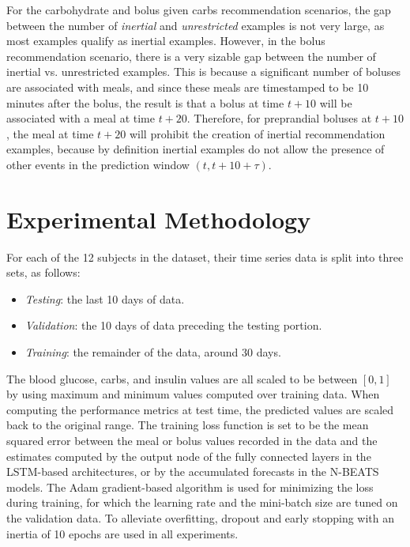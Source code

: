 \documentclass[journal,article,submit,moreauthors,pdftex]{Definitions/mdpi}
\begin{document}
For the carbohydrate and bolus given carbs recommendation scenarios, the gap between the number of {\it inertial} and {\it unrestricted} examples is not very large, as most examples qualify as inertial examples. However, in the bolus recommendation scenario, there is a very sizable gap between the number of inertial vs. unrestricted examples. This is because a significant number of boluses are associated with meals, and since these meals are timestamped to be 10 minutes after the bolus, the result is that a bolus at time $t + 10$ will be associated with a meal at time $t + 20$. Therefore, for preprandial boluses at $t + 10$, the meal at time $t + 20$ will prohibit the creation of inertial recommendation examples, because by definition inertial examples do not allow the presence of other events in the prediction window $(t, t + 10 + \tau)$.


\section{Experimental Methodology}
\label{sec:methodology}

For each of the 12 subjects in the dataset, their time series data is split into three sets, as follows:
\begin{itemize}
    \item {\it Testing}: the last 10 days of data.
    \item {\it Validation}: the 10 days of data preceding the testing portion.
    \item {\it Training}: the remainder of the data, around 30 days.
\end{itemize}
The blood glucose, carbs, and insulin values are all scaled to be between $[0, 1]$ by using maximum and minimum values computed over training data. When computing the performance metrics at test time, the predicted values are scaled back to the original range. The training loss function is set to be the mean squared error between the meal or bolus values recorded in the data and the estimates computed by the output node of the fully connected layers in the LSTM-based architectures, or by the accumulated forecasts in the N-BEATS models. The Adam \cite{kingma:adam} gradient-based algorithm is used for minimizing the loss during training, for which the learning rate and the mini-batch size are tuned on the validation data. To alleviate overfitting, dropout and early stopping with an inertia of 10 epochs are used in all experiments.
\end{document}
